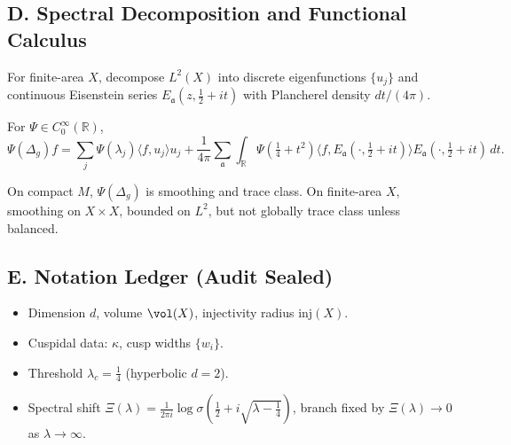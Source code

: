 
\subsection*{D. Spectral Decomposition and Functional Calculus}
\label{subsec:spectral-decomposition-sharp}

\begin{definition}
For finite-area $X$, decompose $L^2(X)$ into discrete eigenfunctions $\{u_j\}$ and continuous Eisenstein series $E_{\mathfrak a}(z,\tfrac12+it)$ with Plancherel density $dt/(4\pi)$.
\end{definition}

\begin{theorem}
For $\Psi\in C_0^\infty(\mathbb R)$,
\[
  \Psi(\Delta_g)f
  =\sum_j \Psi(\lambda_j)\langle f,u_j\rangle u_j
  +\frac{1}{4\pi}\sum_{\mathfrak a}\int_\mathbb R \Psi(\tfrac14+t^2)\langle f,E_{\mathfrak a}(\cdot,\tfrac12+it)\rangle E_{\mathfrak a}(\cdot,\tfrac12+it)\,dt.
\]
\end{theorem}

\begin{remark}
On compact $M$, $\Psi(\Delta_g)$ is smoothing and trace class. On finite-area $X$, smoothing on $X\times X$, bounded on $L^2$, but not globally trace class unless balanced.
\end{remark}


\subsection*{E. Notation Ledger (Audit Sealed)}
\label{subsec:notation-invariants-sharp}

\begin{itemize}
  \item Dimension $d$, volume $\vol(X)$, injectivity radius $\mathrm{inj}(X)$.
  \item Cuspidal data: $\kappa$, cusp widths $\{w_i\}$.
  \item Threshold $\lambda_c=\tfrac14$ (hyperbolic $d=2$).
  \item Spectral shift $\Xi(\lambda)=\frac{1}{2\pi i}\log\sigma(\tfrac12+i\sqrt{\lambda-\tfrac14})$, branch fixed by $\Xi(\lambda)\to0$ as $\lambda\to\infty$.
\end{itemize}

